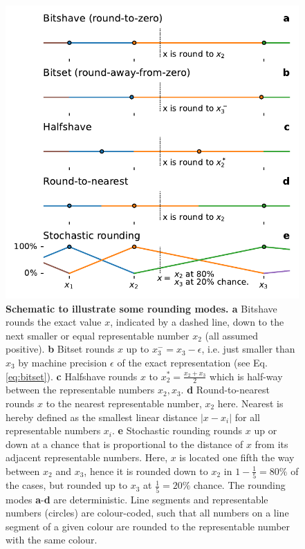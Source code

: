 \begin{figure}[tbhp]
	\includegraphics[width=1\textwidth]{Figures/methods/rounding_modes.pdf}
	\caption{\textbf{Schematic to illustrate some rounding modes. a}
	Bitshave rounds the exact value $x$, indicated by a dashed line, down to the next smaller or equal representable number $x_2$
	(all assumed positive). \textbf{b} Bitset rounds $x$ up to $x_3^- = x_3-\epsilon$, i.e. just smaller than $x_3$ by machine precision
	$\epsilon$ of the exact representation (see Eq. \ref{eq:bitset}). \textbf{c} Halfshave rounds $x$ to $x_2^* = \tfrac{x_2 + x_3}{2}$ which
	is half-way between the representable numbers $x_2,x_3$. \textbf{d} Round-to-nearest rounds $x$ to the nearest representable number,
	$x_2$ here. Nearest is hereby defined as the smallest linear distance $\vert x - x_i \vert$ for all representable numbers $x_i$.
	\textbf{e} Stochastic rounding rounds $x$ up or down at a chance that is proportional to the distance of $x$ from its adjacent representable
	numbers. Here, $x$ is located one fifth the way between $x_2$ and $x_3$, hence it is rounded down to $x_2$ in $1-\tfrac{1}{5} = 80\%$
	of the cases, but rounded up to $x_3$ at $\tfrac{1}{5} = 20\%$ chance. The rounding modes \textbf{a}-\textbf{d} are deterministic.
	Line segments and representable numbers (circles) are colour-coded, such that all numbers on a line segment of a given colour are
	rounded to the representable number with the same colour.}
	\label{fig:methods_rounding_modes}
\end{figure}

